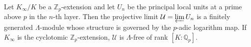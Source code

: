 Let $K_{\infty}/K$ be a $\mathbb{Z}_p$-extension and let $U_n$ be the principal local units at a prime above $p$ in the $n$-th layer. Then the projective limit $\mathcal{U} = \varprojlim U_n$ is a finitely generated $\Lambda$-module whose structure is governed by the $p$-adic logarithm map. If $K_{\infty}$ is the cyclotomic $\mathbb{Z}_p$-extension, $\mathcal{U}$ is $\Lambda$-free of rank $[K:\mathbb{Q}_p]$.
